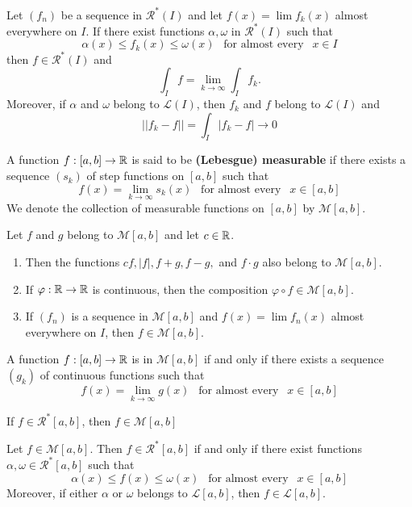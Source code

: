 \begin{theorem}
	Let $(f_n)$ be a sequence in $\mathcal{R}^*(I)$ and let $f(x)=\lim f_k(x)$ almost everywhere on $I$. If there exist functions $\alpha, \omega$ in $\mathcal{R}^*(I)$ such that
	\[\alpha(x)\leq f_k(x)\leq\omega(x)\ \ \text{  for almost every  }\ \ x \in I\]
	then $f \in \mathcal{R}^*(I)$ and
	\[\displaystyle\int_If=\lim\limits_{k \to \infty}\displaystyle\int_I f_k.\]
	Moreover, if $\alpha$ and $\omega$ belong to $\mathcal{L}(I)$, then $f_k$ and $f$ belong to $\mathcal{L}(I)$ and
	\[||f_k-f||=\displaystyle\int_I|f_k-f|\to 0\]
\end{theorem}

\begin{definition}
	A function $f:[a,b]\to\mathbb{R}$ is said to be \textbf{(Lebesgue) measurable} if there exists a sequence $(s_k)$ of step functions on $[a,b]$ such that
	\[f(x)=\lim\limits_{k \to \infty} s_k(x)\ \ \text{  for almost every  }\ \ x \in [a,b]\]
	We denote the collection of measurable functions on $[a,b]$ by $\mathcal{M}[a,b]$.
\end{definition}

\begin{theorem}
	Let $f$ and $g$ belong to $\mathcal{M}[a,b]$ and let $c \in \mathbb{R}$.
	\begin{enumerate}
		\item Then the functions $cf, |f|,f+g,f-g,$ and $f\cdot g$ also belong to $\mathcal{M}[a,b]$.
		\item If $\varphi:\mathbb{R} \to \mathbb{R}$ is continuous, then the composition $\varphi \circ f \in \mathcal{M}[a,b]$.
		\item If $(f_n)$ is a sequence in $\mathcal{M}[a,b]$ and $f(x)=\lim f_n(x)$ almost everywhere on $I$, then $f \in \mathcal{M}[a,b]$.
	\end{enumerate}
\end{theorem}

\begin{theorem}
	A function $f:[a,b]\to\mathbb{R}$ is in $\mathcal{M}[a,b]$ if and only if there exists a sequence $(g_k)$ of continuous functions such that
	\[f(x)=\lim\limits_{k \to \infty} g(x)\ \ \text{  for almost every  }\ \ x \in [a,b]\]
\end{theorem}

\begin{theorem}
	If $f \in \mathcal{R}^*[a,b]$, then $f \in \mathcal{M}[a,b]$
\end{theorem}

\begin{theorem}
	Let $f\in\mathcal{M}[a,b]$. Then $f \in \mathcal{R}^*[a,b]$ if and only if there exist functions $\alpha, \omega \in \mathcal{R}^*[a,b]$ such that
	\[\alpha(x)\leq f(x)\leq \omega(x)\ \ \text{  for almost every  }\ \ x \in [a,b]\]
	Moreover, if either $\alpha$ or $\omega$ belongs to $\mathcal{L}[a,b]$, then $f \in \mathcal{L}[a,b]$.
\end{theorem}

